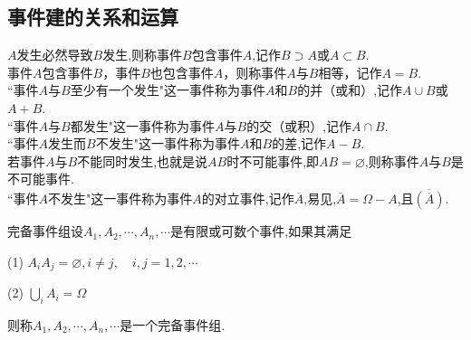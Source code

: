 \subsection{事件建的关系和运算}
$A$发生必然导致$B$发生,则称事件$B$包含事件$A$,记作$B\supset A$或$A\subset B$.\jg\\
事件$A$包含事件$B$，事件$B$也包含事件$A$，则称事件$A$与$B$相等，记作$A=B$.\jg\\
``事件$A$与$B$至少有一个发生"这一事件称为事件$A$和$B$的并（或和）,记作$A\cup B$或$A+B$.\jg\\
``事件$A$与$B$都发生"这一事件称为事件$A$与$B$的交（或积）,记作$A\cap B$.\jg\\
``事件$A$发生而$B$不发生"这一事件称为事件$A$和$B$的差,记作$A-B$.\jg\\
若事件$A$与$B$不能同时发生,也就是说$AB$时不可能事件,即$AB=\varnothing$,则称事件$A$与$B$是不可能事件.\jg\\
``事件$A$不发生"这一事件称为事件$A$的对立事件,记作$\overline{A}$,易见,$\overline{A}=\Omega -A$,且$\overline{(\overline{A})}$.\jg\\
\dya[有限个事件的并与交]\jg
\newpage 
\noindent{}
\par 完备事件组设$A_1,A_2,\cdots,A_n,\cdots$是有限或可数个事件,如果其满足
\par \quad (1)  $A_iA_j=\varnothing,i\ne j,\quad i,j=1,2,\cdots $
\par \quad (2)  $\bigcup\limits_iA_i=\Omega$
\par 则称$A_1,A_2,\cdots,A_n,\cdots$是一个完备事件组.\jg\\
\dya[事件的关系与运算的文氏图]\jg

